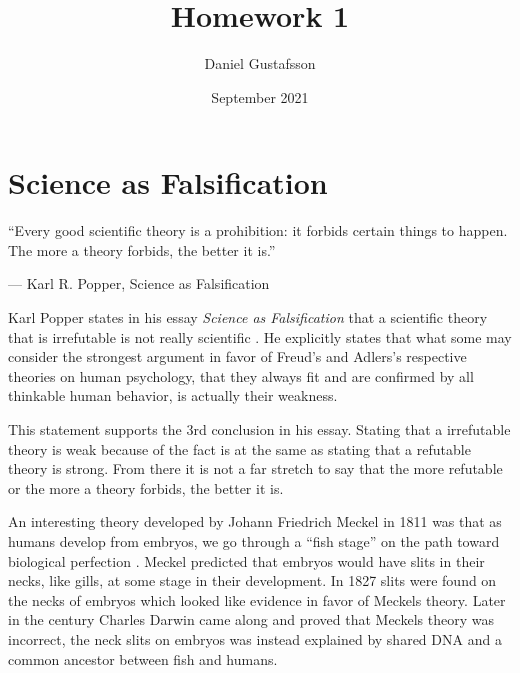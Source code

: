 \documentclass[11pt,a4paper]{article}
\begin{document}
\title{Homework 1}
\author{Daniel Gustafsson}
\date{September 2021}
\maketitle
	
\section{Science as Falsification}
\epigraph{``Every good scientific theory is a prohibition: it forbids certain things to happen. The more a theory forbids, the better it is.''}{--- \textup{Karl R. Popper}, Science as Falsification}

Karl Popper states in his essay \textit{Science as Falsification} that a scientific theory that is irrefutable is not really scientific \cite{saf}.
He explicitly states that what some may consider the strongest argument in favor of Freud's and Adlers's respective theories on human psychology,
that they always fit and are confirmed by all thinkable human behavior, is actually their weakness.

This statement supports the 3rd conclusion in his essay. 
Stating that a irrefutable theory is weak because of the fact is at the same as stating that a refutable theory is strong.
From there it is not a far stretch to say that the more refutable or the more a theory forbids, the better it is.

An interesting theory developed by Johann Friedrich Meckel in 1811 was that as humans develop from embryos, we go through a ``fish stage'' on the
path toward biological perfection \cite{fish}. Meckel predicted that embryos would have slits in their necks, like gills, at some stage in their development.
In 1827 slits were found on the necks of embryos which looked like evidence in favor of Meckels theory.
Later in the century Charles Darwin came along and proved that Meckels theory was incorrect, the neck slits on embryos was instead explained by 
shared DNA and a common ancestor between fish and humans. 
\end{document}
